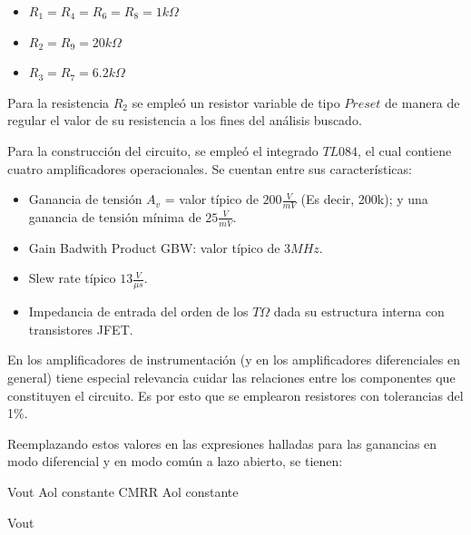 \begin{itemize}
    \item $R_{1} = R_{4} = R_{6} = R_{8} = 1k\Omega$
\end{itemize}
\begin{itemize}
    \item $R_{2} = R_{9} = 20k\Omega$
\end{itemize}
\begin{itemize}
    \item $R_{3} = R_{7} = 6.2k\Omega$
\end{itemize}

Para la resistencia $R_{2}$ se empleó un resistor variable de tipo $Preset$ de manera de regular el valor de su resistencia a los fines del análisis buscado. 

Para la construcción del circuito, se empleó el integrado $TL084$, el cual contiene cuatro amplificadores operacionales. Se cuentan entre sus características:

\begin{itemize}
    \item Ganancia de tensión $A_{v}$ = valor típico de $200\frac{V}{mV}$ (Es decir, 200k); y una ganancia de tensión mínima de $25\frac{V}{mV}$. 
\end{itemize}
\begin{itemize}
    \item Gain Badwith Product GBW: valor típico de 3$MHz$.
\end{itemize}
\begin{itemize}
    \item Slew rate típico $13\frac{V}{\mu s}$.
\end{itemize}
\begin{itemize}
    \item Impedancia de entrada del orden de los $T\Omega$ dada su estructura interna con transistores JFET.
\end{itemize}

En los amplificadores de instrumentación (y en los amplificadores diferenciales en general) tiene especial relevancia cuidar las relaciones entre los componentes que constituyen el circuito. Es por esto que se emplearon resistores con tolerancias del 1\%. 

Reemplazando estos valores en las expresiones halladas para las ganancias en modo diferencial y en modo común a lazo abierto, se tienen:


Vout Aol constante
CMRR Aol constante

Vout 

